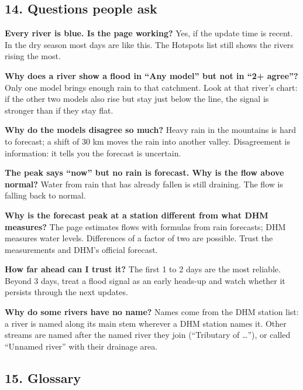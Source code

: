\documentclass[
  10pt,
]{article}
\begin{document}
\hypertarget{questions-people-ask}{%
\subsection{14. Questions people ask}\label{questions-people-ask}}

\textbf{Every river is blue. Is the page working?} Yes, if the update
time is recent. In the dry season most days are like this. The Hotspots
list still shows the rivers rising the most.

\textbf{Why does a river show a flood in ``Any model'' but not in ``2+
agree''?} Only one model brings enough rain to that catchment. Look at
that river's chart: if the other two models also rise but stay just
below the line, the signal is stronger than if they stay flat.

\textbf{Why do the models disagree so much?} Heavy rain in the mountains
is hard to forecast; a shift of 30 km moves the rain into another
valley. Disagreement is information: it tells you the forecast is
uncertain.

\textbf{The peak says ``now'' but no rain is forecast. Why is the flow
above normal?} Water from rain that has already fallen is still
draining. The flow is falling back to normal.

\textbf{Why is the forecast peak at a station different from what DHM
measures?} The page estimates flows with formulas from rain forecasts;
DHM measures water levels. Differences of a factor of two are possible.
Trust the measurements and DHM's official forecast.

\textbf{How far ahead can I trust it?} The first 1 to 2 days are the
most reliable. Beyond 3 days, treat a flood signal as an early heads-up
and watch whether it persists through the next updates.

\textbf{Why do some rivers have no name?} Names come from the DHM
station list: a river is named along its main stem wherever a DHM
station names it. Other streams are named after the named river they
join (``Tributary of \ldots{}''), or called ``Unnamed river'' with their
drainage area.

\hypertarget{glossary}{%
\subsection{15. Glossary}\label{glossary}}
\end{document}
